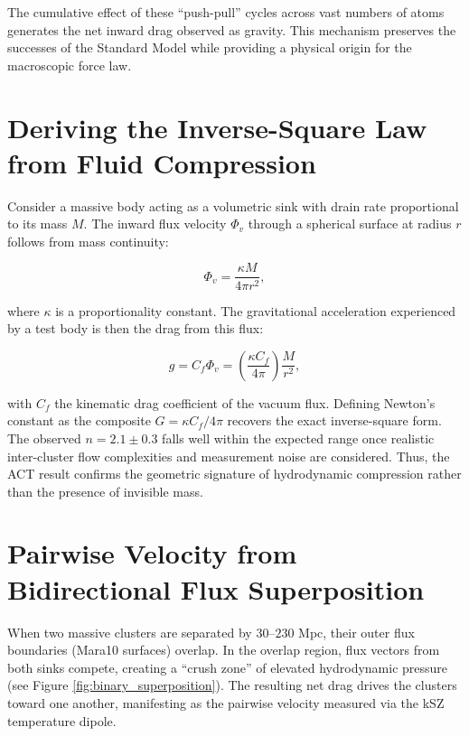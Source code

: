 \documentclass[11pt, a4paper]{article}
\begin{document}
The cumulative effect of these ``push-pull'' cycles across vast numbers of atoms generates the net inward drag observed as gravity. This mechanism preserves the successes of the Standard Model while providing a physical origin for the macroscopic force law.

\section{Deriving the Inverse-Square Law from Fluid Compression}
Consider a massive body acting as a volumetric sink with drain rate proportional to its mass $M$. The inward flux velocity $\Phi_v$ through a spherical surface at radius $r$ follows from mass continuity:

\begin{equation}
  \Phi_v = \frac{\kappa M}{4\pi r^2},
\end{equation}

where $\kappa$ is a proportionality constant. The gravitational acceleration experienced by a test body is then the drag from this flux:

\begin{equation}
  g = C_f \Phi_v = \left( \frac{\kappa C_f}{4\pi} \right) \frac{M}{r^2},
\end{equation}

with $C_f$ the kinematic drag coefficient of the vacuum flux. Defining Newton's constant as the composite $G = \kappa C_f / 4\pi$ recovers the exact inverse-square form. The observed $n = 2.1 \pm 0.3$ falls well within the expected range once realistic inter-cluster flow complexities and measurement noise are considered. Thus, the ACT result confirms the geometric signature of hydrodynamic compression rather than the presence of invisible mass.

\section{Pairwise Velocity from Bidirectional Flux Superposition}
When two massive clusters are separated by $30$--$230$ Mpc, their outer flux boundaries (Mara10 surfaces) overlap. In the overlap region, flux vectors from both sinks compete, creating a ``crush zone'' of elevated hydrodynamic pressure (see Figure \ref{fig:binary_superposition}). The resulting net drag drives the clusters toward one another, manifesting as the pairwise velocity measured via the kSZ temperature dipole.
\end{document}
